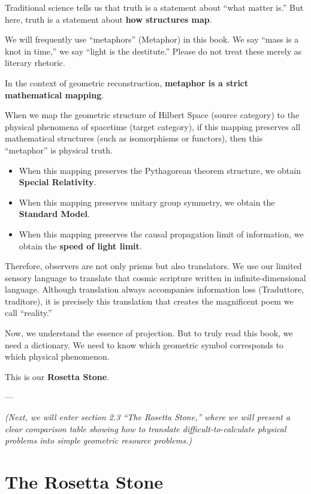 \documentclass[11pt,a4paper,twoside]{book}
\begin{document}
Traditional science tells us that truth is a statement about ``what matter is.'' But here, truth is a statement about \textbf{how structures map}.

We will frequently use ``metaphors'' (Metaphor) in this book. We say ``mass is a knot in time,'' we say ``light is the destitute.'' Please do not treat these merely as literary rhetoric.

In the context of geometric reconstruction, \textbf{metaphor is a strict mathematical mapping}.

When we map the geometric structure of Hilbert Space (source category) to the physical phenomena of spacetime (target category), if this mapping preserves all mathematical structures (such as isomorphisms or functors), then this ``metaphor'' is physical truth.

\begin{itemize}
\item When this mapping preserves the Pythagorean theorem structure, we obtain \textbf{Special Relativity}.

\item When this mapping preserves unitary group symmetry, we obtain the \textbf{Standard Model}.

\item When this mapping preserves the causal propagation limit of information, we obtain the \textbf{speed of light limit}.
\end{itemize}

Therefore, observers are not only prisms but also translators. We use our limited sensory language to translate that cosmic scripture written in infinite-dimensional language. Although translation always accompanies information loss (Traduttore, traditore), it is precisely this translation that creates the magnificent poem we call ``reality.''

Now, we understand the essence of projection. But to truly read this book, we need a dictionary. We need to know which geometric symbol corresponds to which physical phenomenon.

This is our \textbf{Rosetta Stone}.

---

\textit{(Next, we will enter section 2.3 ``The Rosetta Stone,'' where we will present a clear comparison table showing how to translate difficult-to-calculate physical problems into simple geometric resource problems.)}

 \section{The Rosetta Stone}
\end{document}
